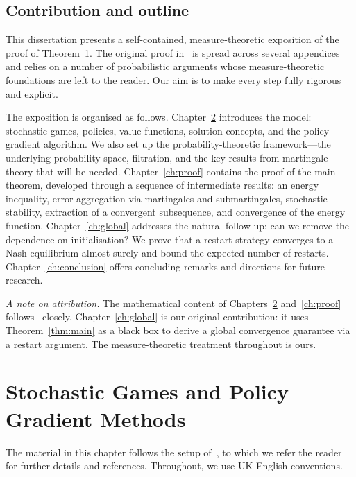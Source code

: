 \documentclass[a4paper,oneside,11pt]{report}
\numberwithin{theorem}{chapter}
\numberwithin{equation}{chapter}
\begin{document}
\section{Contribution and outline}

This dissertation presents a self-contained, measure-theoretic
exposition of the proof of Theorem~1. The original proof
in~\cite{giannou2022} is spread across several appendices and relies on
a number of probabilistic arguments whose measure-theoretic foundations
are left to the reader. Our aim is to make every step fully rigorous and
explicit.

The exposition is organised as follows. Chapter~\ref{ch:prelim}
introduces the model: stochastic games, policies, value functions,
solution concepts, and the policy gradient algorithm. We also set up the
probability-theoretic framework---the underlying probability space,
filtration, and the key results from martingale theory that will be
needed. Chapter~\ref{ch:proof} contains the proof of the main theorem,
developed through a sequence of intermediate results: an energy
inequality, error aggregation via martingales and submartingales,
stochastic stability, extraction of a convergent subsequence, and
convergence of the energy function. Chapter~\ref{ch:global} addresses
the natural follow-up: can we remove the dependence on initialisation?
We prove that a restart strategy converges to a Nash equilibrium almost
surely and bound the expected number of restarts.
Chapter~\ref{ch:conclusion} offers concluding remarks and directions
for future research.

\emph{A note on attribution.} The mathematical content of Chapters~\ref{ch:prelim}
and~\ref{ch:proof} follows~\cite{giannou2022} closely.
Chapter~\ref{ch:global} is our original contribution: it uses
Theorem~\ref{thm:main} as a black box to derive a global convergence
guarantee via a restart argument. The measure-theoretic treatment
throughout is ours.


\chapter{Stochastic Games and Policy Gradient Methods}
\label{ch:prelim}

The material in this chapter follows the setup
of~\cite{giannou2022}, to which we refer the reader for further
details and references. Throughout, we use UK English conventions.
\end{document}
